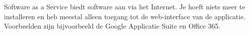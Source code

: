 Software as a Service biedt software aan via het Internet. Je hoeft niets meer te installeren en heb meestal alleen toegang tot de web-interface van de applicatie. Voorbeelden zijn bijvoorbeeld de Google Applicatie Suite en Office 365.
